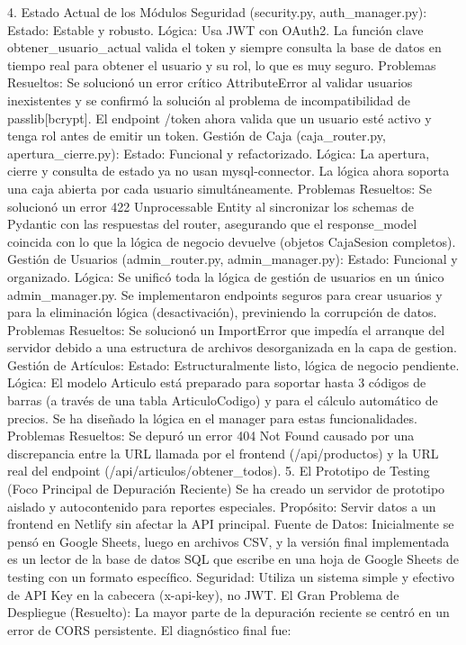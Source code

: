 4. Estado Actual de los Módulos
Seguridad (security.py, auth_manager.py):
Estado: Estable y robusto.
Lógica: Usa JWT con OAuth2. La función clave obtener_usuario_actual valida el token y siempre consulta la base de datos en tiempo real para obtener el usuario y su rol, lo que es muy seguro.
Problemas Resueltos: Se solucionó un error crítico AttributeError al validar usuarios inexistentes y se confirmó la solución al problema de incompatibilidad de passlib[bcrypt]. El endpoint /token ahora valida que un usuario esté activo y tenga rol antes de emitir un token.
Gestión de Caja (caja_router.py, apertura_cierre.py):
Estado: Funcional y refactorizado.
Lógica: La apertura, cierre y consulta de estado ya no usan mysql-connector. La lógica ahora soporta una caja abierta por cada usuario simultáneamente.
Problemas Resueltos: Se solucionó un error 422 Unprocessable Entity al sincronizar los schemas de Pydantic con las respuestas del router, asegurando que el response_model coincida con lo que la lógica de negocio devuelve (objetos CajaSesion completos).
Gestión de Usuarios (admin_router.py, admin_manager.py):
Estado: Funcional y organizado.
Lógica: Se unificó toda la lógica de gestión de usuarios en un único admin_manager.py. Se implementaron endpoints seguros para crear usuarios y para la eliminación lógica (desactivación), previniendo la corrupción de datos.
Problemas Resueltos: Se solucionó un ImportError que impedía el arranque del servidor debido a una estructura de archivos desorganizada en la capa de gestion.
Gestión de Artículos:
Estado: Estructuralmente listo, lógica de negocio pendiente.
Lógica: El modelo Articulo está preparado para soportar hasta 3 códigos de barras (a través de una tabla ArticuloCodigo) y para el cálculo automático de precios. Se ha diseñado la lógica en el manager para estas funcionalidades.
Problemas Resueltos: Se depuró un error 404 Not Found causado por una discrepancia entre la URL llamada por el frontend (/api/productos) y la URL real del endpoint (/api/articulos/obtener_todos).
5. El Prototipo de Testing (Foco Principal de Depuración Reciente)
Se ha creado un servidor de prototipo aislado y autocontenido para reportes especiales.
Propósito: Servir datos a un frontend en Netlify sin afectar la API principal.
Fuente de Datos: Inicialmente se pensó en Google Sheets, luego en archivos CSV, y la versión final implementada es un lector de la base de datos SQL que escribe en una hoja de Google Sheets de testing con un formato específico.
Seguridad: Utiliza un sistema simple y efectivo de API Key en la cabecera (x-api-key), no JWT.
El Gran Problema de Despliegue (Resuelto): La mayor parte de la depuración reciente se centró en un error de CORS persistente. El diagnóstico final fue:
